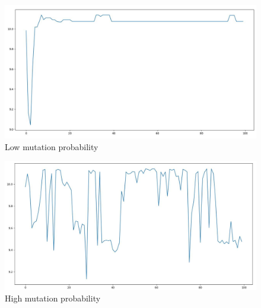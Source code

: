 \documentclass{classrep}
\begin{document}
{        \begin{figure}[!htbp]
            \centering
            \includegraphics[width=1.1\textwidth]{img/low_mutation_probability.jpg}
            \caption{Low mutation probability}
            \label{fig:low_mutation_probability}
        \end{figure}

        \begin{figure}[!htbp]
            \centering
            \includegraphics[width=1.1\textwidth]{img/high_mutation_probability.jpg}
            \caption{High mutation probability}
            \label{fig:high_mutation_probability}
        \end{figure}
        \FloatBarrier
    }
\end{document}
